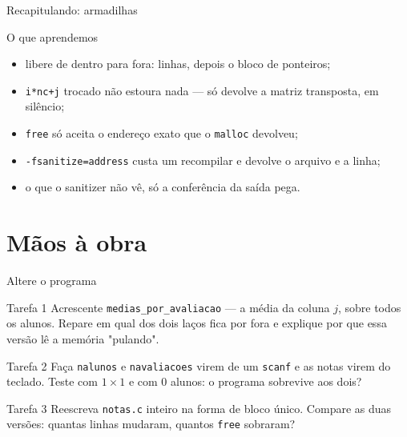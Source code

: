 \documentclass[aspectratio=169]{beamer}
\begin{document}
\begin{frame}{Recapitulando: armadilhas}
  \begin{block}{O que aprendemos}
    \begin{itemize}
      \item libere de dentro para fora: linhas, depois o bloco de ponteiros;
      \item \texttt{i*nc+j} trocado não estoura nada --- só devolve a matriz
        transposta, em silêncio;
      \item \texttt{free} só aceita o endereço exato que o \texttt{malloc}
        devolveu;
      \item \texttt{-fsanitize=address} custa um recompilar e devolve o arquivo
        e a linha;
      \item o que o sanitizer não vê, só a conferência da saída pega.
    \end{itemize}
  \end{block}
\end{frame}

\section{Mãos à obra}

\begin{frame}{Altere o programa}
  \begin{block}{Tarefa 1}
    Acrescente \texttt{medias\_por\_avaliacao} --- a média da coluna $j$,
    sobre todos os alunos. Repare em qual dos dois laços fica por fora e
    explique por que essa versão lê a memória "pulando".
  \end{block}
  \begin{block}{Tarefa 2}
    Faça \texttt{nalunos} e \texttt{navaliacoes} virem de um \texttt{scanf} e
    as notas virem do teclado. Teste com $1 \times 1$ e com $0$ alunos: o
    programa sobrevive aos dois?
  \end{block}
  \begin{block}{Tarefa 3}
    Reescreva \texttt{notas.c} inteiro na forma de bloco único. Compare as duas
    versões: quantas linhas mudaram, quantos \texttt{free} sobraram?
  \end{block}
\end{frame}
\end{document}
